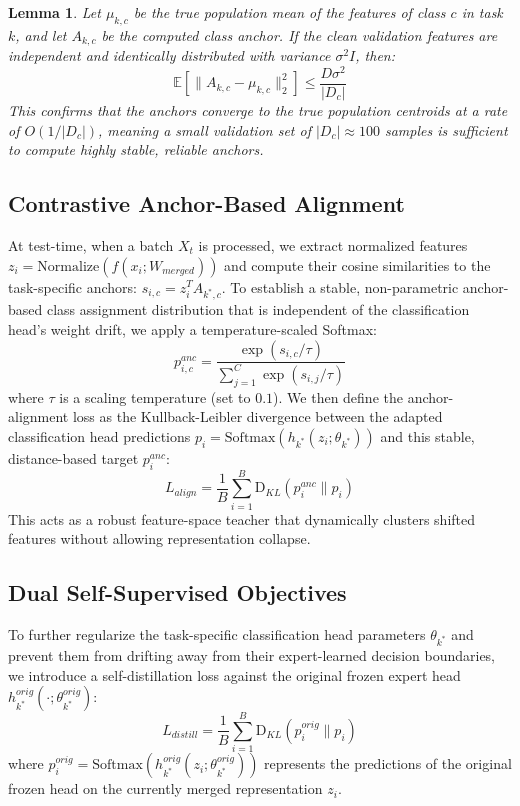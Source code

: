 \documentclass{article}
\theoremstyle{plain}
\newtheorem{lemma}[theorem]{Lemma}
\theoremstyle{definition}
\theoremstyle{remark}
\begin{document}
\begin{lemma}
\label{lem:anchor_convergence}
Let $\mu_{k, c}$ be the true population mean of the features of class $c$ in task $k$, and let $A_{k, c}$ be the computed class anchor. If the clean validation features are independent and identically distributed with variance $\sigma^2 I$, then:
\begin{equation}
    \mathbb{E}[\| A_{k, c} - \mu_{k, c} \|_2^2] \le \frac{D \sigma^2}{|D_c|}
\end{equation}
This confirms that the anchors converge to the true population centroids at a rate of $O(1/|D_c|)$, meaning a small validation set of $|D_c| \approx 100$ samples is sufficient to compute highly stable, reliable anchors.
\end{lemma}

\subsection{Contrastive Anchor-Based Alignment}
At test-time, when a batch $X_t$ is processed, we extract normalized features $z_i = \text{Normalize}(f(x_i; W_{merged}))$ and compute their cosine similarities to the task-specific anchors: $s_{i, c} = z_i^T A_{k^*, c}$.
To establish a stable, non-parametric anchor-based class assignment distribution that is independent of the classification head's weight drift, we apply a temperature-scaled Softmax:
\begin{equation}
    p_{i, c}^{anc} = \frac{\exp(s_{i, c} / \tau)}{\sum_{j=1}^C \exp(s_{i, j} / \tau)}
\end{equation}
where $\tau$ is a scaling temperature (set to $0.1$). We then define the anchor-alignment loss as the Kullback-Leibler divergence between the adapted classification head predictions $p_i = \text{Softmax}(h_{k^*}(z_i; \theta_{k^*}))$ and this stable, distance-based target $p_i^{anc}$:
\begin{equation}
    L_{align} = \frac{1}{B} \sum_{i=1}^B \text{D}_{KL}\left( p_{i}^{anc} \parallel p_i \right)
\end{equation}
This acts as a robust feature-space teacher that dynamically clusters shifted features without allowing representation collapse.

\subsection{Dual Self-Supervised Objectives}
To further regularize the task-specific classification head parameters $\theta_{k^*}$ and prevent them from drifting away from their expert-learned decision boundaries, we introduce a self-distillation loss against the original frozen expert head $h_{k^*}^{orig}(\cdot; \theta_{k^*}^{orig})$:
\begin{equation}
    L_{distill} = \frac{1}{B} \sum_{i=1}^B \text{D}_{KL}\left( p_{i}^{orig} \parallel p_i \right)
\end{equation}
where $p_i^{orig} = \text{Softmax}(h_{k^*}^{orig}(z_i; \theta_{k^*}^{orig}))$ represents the predictions of the original frozen head on the currently merged representation $z_i$.
\end{document}
